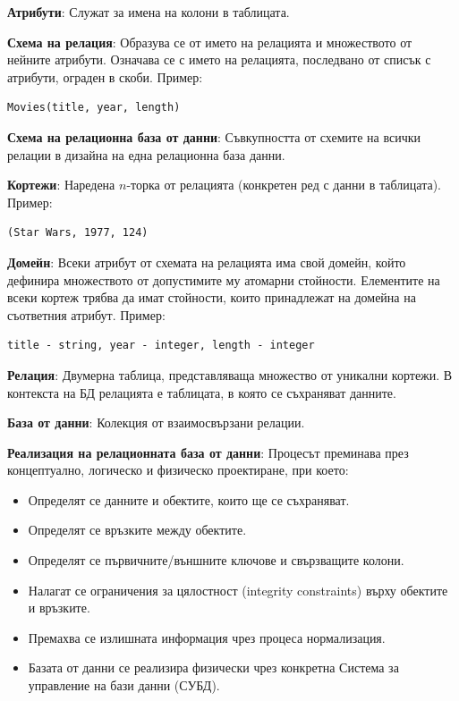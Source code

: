 \documentclass{article}
\renewcommand{\\}{\newline}
\begin{document}
\textbf{Атрибути}: Служат за имена на колони в таблицата.

\textbf{Схема на релация}: Образува се от името на релацията и множеството от нейните атрибути. Означава се с името на релацията, последвано от списък с атрибути, ограден в скоби. Пример:
\begin{verbatim}
Movies(title, year, length)
\end{verbatim}

\textbf{Схема на релационна база от данни}: Съвкупността от схемите на всички релации в дизайна на една релационна база данни.

\textbf{Кортежи}: Наредена $n$-торка от релацията (конкретен ред с данни в таблицата). Пример:
\begin{verbatim}
(Star Wars, 1977, 124)
\end{verbatim}

\textbf{Домейн}: Всеки атрибут от схемата на релацията има свой домейн, който дефинира множеството от допустимите му атомарни стойности. Елементите на всеки кортеж трябва да имат стойности, които принадлежат на домейна на съответния атрибут. Пример:
\begin{verbatim}
title - string, year - integer, length - integer
\end{verbatim}

\textbf{Релация}: Двумерна таблица, представляваща множество от уникални кортежи. В контекста на БД релацията е таблицата, в която се съхраняват данните.

\textbf{База от данни}: Колекция от взаимосвързани релации. 

\textbf{Реализация на релационната база от данни}: 
Процесът преминава през концептуално, логическо и физическо проектиране, при което:
\begin{itemize}
    \item Определят се данните и обектите, които ще се съхраняват.
    \item Определят се връзките между обектите.
    \item Определят се първичните/външните ключове и свързващите колони.
    \item Налагат се ограничения за цялостност (integrity constraints) върху обектите и връзките.
    \item Премахва се излишната информация чрез процеса нормализация.
    \item Базата от данни се реализира физически чрез конкретна Система за управление на бази данни (СУБД).
\end{itemize}
\end{document}
